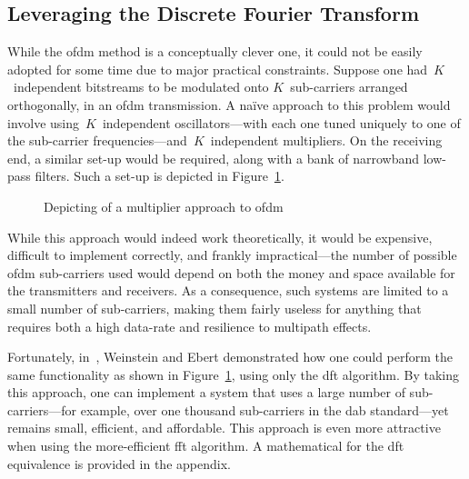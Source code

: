 \documentclass[class=report,11pt,crop=false]{standalone}
\begin{document}
\subsection{Leveraging the Discrete Fourier Transform}
While the \gls{ofdm} method is a conceptually clever one, it could not be easily adopted for some time due to major practical constraints. Suppose one had~\(K\)~independent bitstreams to be modulated onto \(K\)~sub-carriers arranged orthogonally, in an \gls{ofdm} transmission. A na\"ive approach to this problem would involve using~\(K\)~independent oscillators---with each one tuned uniquely to one of the sub-carrier frequencies---and~\(K\)~independent multipliers. On the receiving end, a similar set-up would be required, along with a bank of narrowband low-pass filters. Such a set-up is depicted in Figure~\ref{fig:ofdm-multipliers}.
\begin{figure}
    \centering
    \captionsetup{type=figure}
    \def\svgwidth{0.90\linewidth}
    {
        \scriptsize
        
    }
    \caption{Depicting of a multiplier approach to \gls{ofdm}}
    \label{fig:ofdm-multipliers}
\end{figure}
While this approach would indeed work theoretically, it would be expensive, difficult to implement correctly, and frankly impractical---the number of possible \gls{ofdm} sub-carriers used would depend on both the money and space available for the transmitters and receivers. As a consequence, such systems are limited to a small number of sub-carriers, making them fairly useless for anything that requires both a high data-rate and resilience to multipath effects.

Fortunately, in~\cite{Weinstein1971}, Weinstein and Ebert demonstrated how one could perform the same functionality as shown in Figure~\ref{fig:ofdm-multipliers}, using only the \gls{dft} algorithm. By taking this approach, one can implement a system that uses a large number of sub-carriers---for example, over one thousand sub-carriers in the \gls{dab} standard---yet remains small, efficient, and affordable. This approach is even more attractive when using the more-efficient \gls{fft} algorithm. A mathematical for the \gls{dft} equivalence is provided in the appendix.
\end{document}
